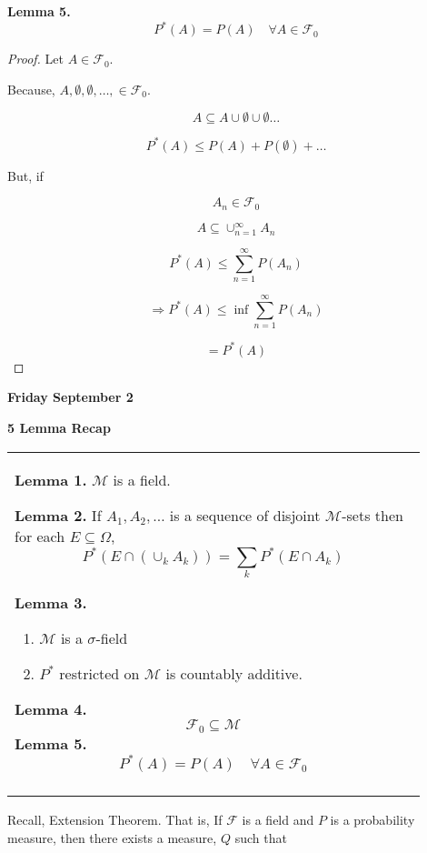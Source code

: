 \documentclass[11pt,fleqn]{book} %
\begin{document}
\textbf{Lemma 5.}$$P^*(A) = P(A) \quad \forall A \in \mathscr{F}_0$$

\begin{proof}
	Let $A \in \mathscr{F}_0$. 

	Because,  $A, \emptyset, \emptyset, \dots, \in \mathscr{F}_0$. 

	$$A \subseteq A \cup \emptyset \cup \emptyset \dots $$

	$$P^*(A) \leq P(A) + P(\emptyset) + \dots $$

But, if 

$$A_n \in \mathscr{F}_0$$

$$A \subseteq \cup^\infty_{n=1} A_n $$

$$P^*(A) \leq \displaystyle \sum^\infty_{n=1} P(A_n)$$

$$\Rightarrow P^*(A) \leq \inf \displaystyle \sum^\infty_{n=1} P(A_n) $$

$$ = P^*(A)$$
\end{proof}

\textbf{Friday September 2}

\begin{remark}
	\textbf{5 Lemma Recap}

	\begin{tabular}{|p{0.9\linewidth}|}\hline %
\rule{0pt}{5ex}%
		
	\textbf{Lemma 1.} $\mathscr{M}$ is a field.

	\textbf{Lemma 2.} If $A_1, A_2, \dots$ is a sequence of disjoint $\mathscr{M}$-sets then for each $E \subseteq \Omega$, 
	$$P^*(E\cap(\cup_k A_k)) = \displaystyle \sum_k P^*(E \cap A_k) $$

	\textbf{Lemma 3.}
	
	\begin{enumerate}
		\item $\mathscr{M}$ is a $\sigma$-field
		\item $P^*$ restricted on $\mathscr{M}$ is countably additive. 
	\end{enumerate}
	
	\textbf{Lemma 4.} $$\mathscr{F}_0 \subseteq \mathscr{M}$$
	\textbf{Lemma 5.}$$P^*(A) = P(A) \quad \forall A \in \mathscr{F}_0$$
	\text{ }\\
	\\\hline
\end{tabular}
\end{remark}

Recall, Extension Theorem. That is, If $\mathscr{F}$ is a field and $P$ is a probability measure, then there exists a measure, $Q$ such that 
\end{document}

